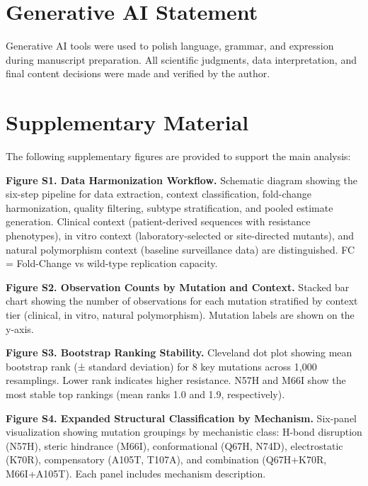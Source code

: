 \documentclass[12pt,a4paper]{article}
\begin{document}
\section*{Generative AI Statement}
Generative AI tools were used to polish language, grammar, and expression during manuscript preparation. All scientific judgments, data interpretation, and final content decisions were made and verified by the author.

\section*{Supplementary Material}

The following supplementary figures are provided to support the main analysis:

\bigskip
\noindent\textbf{Figure S1. Data Harmonization Workflow.}
Schematic diagram showing the six-step pipeline for data extraction, context classification, fold-change harmonization, quality filtering, subtype stratification, and pooled estimate generation. Clinical context (patient-derived sequences with resistance phenotypes), in vitro context (laboratory-selected or site-directed mutants), and natural polymorphism context (baseline surveillance data) are distinguished. FC = Fold-Change vs wild-type replication capacity.

\bigskip
\noindent\textbf{Figure S2. Observation Counts by Mutation and Context.}
Stacked bar chart showing the number of observations for each mutation stratified by context tier (clinical, in vitro, natural polymorphism). Mutation labels are shown on the y-axis.

\bigskip
\noindent\textbf{Figure S3. Bootstrap Ranking Stability.}
Cleveland dot plot showing mean bootstrap rank (± standard deviation) for 8 key mutations across 1,000 resamplings. Lower rank indicates higher resistance. N57H and M66I show the most stable top rankings (mean ranks 1.0 and 1.9, respectively).

\bigskip
\noindent\textbf{Figure S4. Expanded Structural Classification by Mechanism.}
Six-panel visualization showing mutation groupings by mechanistic class: H-bond disruption (N57H), steric hindrance (M66I), conformational (Q67H, N74D), electrostatic (K70R), compensatory (A105T, T107A), and combination (Q67H+K70R, M66I+A105T). Each panel includes mechanism description.
\end{document}
